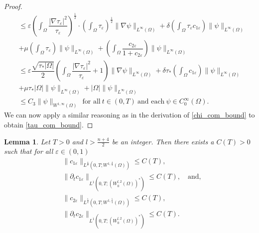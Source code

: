 \documentclass[a4paper,10pt]{article}
\newtheorem{Lemma}[Theorem]{Lemma}
\theoremstyle{definition}
\begin{document}
\begin{proof}
\begin{align*}
    & \nonumber \leq \varepsilon \left(\int_\Omega \dfrac{|\nabla \tau_\varepsilon|^2}{\tau_\varepsilon}\right)^{\frac{1}{2}} \cdot \left(\int_\Omega \tau_\varepsilon\right)^{\frac{1}{2}} \|\nabla \psi\|_{L^\infty(\Omega)}
    + \delta \left(\int_\Omega \tau_\varepsilon c_{1\varepsilon}\right)\|\psi\|_{L^\infty(\Omega)}\\[7pt]
    & \nonumber  + \mu \left(\int_\Omega \tau_\varepsilon \right)\|\psi\|_{L^\infty(\Omega)} + \left(\int_\Omega\dfrac{c_{2\varepsilon}}{1 + c_{2\varepsilon}}\right) \|\psi\|_{L^\infty(\Omega)} \\[7pt]
    & \nonumber \leq \varepsilon \dfrac{\sqrt{\tau_\ast |\Omega|}}{2} \left(\int_\Omega \dfrac{|\nabla \tau_\varepsilon|^2}{\tau_\varepsilon} + 1\right)  \|\nabla \psi\|_{L^\infty(\Omega)} + \delta \tau_\ast \left(\int_\Omega c_{1\varepsilon}\right)\|\psi\|_{L^\infty(\Omega)} \\[7pt]
    & \nonumber + \mu \tau_\ast |\Omega| \|\psi\|_{L^\infty(\Omega)} + |\Omega| \|\psi\|_{L^\infty(\Omega)} \\[7pt]
    & \leq C_3\|\psi\|_{W^{1, \infty}(\Omega)} ~~\text{for all}~ t \in (0, T) ~ \text{and each}~ \psi \in C^\infty_{0}(\Omega).
  \end{align*}
  We can now apply a similar reasoning as in the derivation of \eqref{chi_com_bound} to obtain \eqref{tau_com_bound}.
\end{proof}
\begin{Lemma}
  \label{c1_tim_der}
  Let $T > 0$ and $l > \frac{n + 4}{2}$ be an integer. Then there exists a $C(T) > 0$ such that for all $\varepsilon \in (0, 1)$
  \begin{align}
    \label{c1_tim1} & \|c_{1\varepsilon}\|_{L^{\frac{4}{3}}(0, T; W^{1, \frac{4}{3}}(\Omega))} \leq C(T),   \\[5pt]
    \label{c1_tim2} & \|\partial_t c_{1\varepsilon}\|_{L^{1}(0, T; (W^{l, 2}_0(\Omega))^\ast)} \leq C(T), \quad \text{and}, \\[5pt]
    \label{c2_tim1} & \|c_{2\varepsilon}\|_{L^{\frac{5}{4}}(0, T; W^{1, \frac{5}{4}}(\Omega))} \leq C(T),   \\[5pt]
    \label{c2_tim2} & \|\partial_t c_{2\varepsilon}\|_{L^{1}(0, T; (W^{l, 2}_0(\Omega))^\ast)} \leq C(T).
  \end{align}
\end{Lemma}
\end{document}
